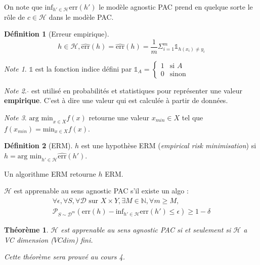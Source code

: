 \documentclass{article}
\newtheorem{theorem}{Théorème}[section]
\theoremstyle{definition}
\newtheorem{definition}{Définition}[section]
\theoremstyle{remark}
\newtheorem*{note}{Note}
\begin{document}
On note que $\mbox{inf}_{h'\in\mathcal{H}}\mbox{err}(h')$  le modèle  agnostic PAC prend en quelque sorte le rôle de $c\in\mathcal{H}$ dans le modèle PAC. 

\begin{definition}[Erreur empirique]
    $$h\in\mathcal{H}, \widehat{\mbox{err}}(h) = \widehat{\mbox{err}}(h)=\frac{1}{m}\Sigma_{i=1}^m\mathbb{1}_{h(x_i)\neq y_i}$$
\end{definition}

\begin{note}
    $\mathbb{1}$ est la fonction indice défini par 
    $\mathbb{1}_{A} =
        \begin{cases}
            1 & \text{si $A$}\\
            0 & \text{sinon}
        \end{cases}
    $
\end{note}
\begin{note}  
    $\widehat{}$  est utilisé en probabilités et statistiques pour représenter une valeur \textbf{empirique}. C'est à dire une valeur qui est calculée à partir de données. 
\end{note}
\begin{note}
    $\mbox{arg min}_{x\in X} f(x)$ retourne une valeur $x_{min}\in X$ tel que $f(x_{min}) = \mbox{min}_{x\in X} f(x)$.  
\end{note}

\begin{definition}[ERM]
    $h$ est une hypothèse ERM (\textit{empirical risk minimisation}) si $h = \mbox{arg min}_{h'\in\mathcal{H}}\widehat{\mbox{err}}(h')$.
\end{definition}

Un algorithme ERM retourne $h$ ERM.

$\mathcal{H}$ est apprenable au sens agnostic PAC s'il existe un algo : 
\begin{multline}
    \forall\epsilon, \forall S, \forall\mathcal{D} \mbox{ sur } X\times Y, \exists M\in\mathbb{N}, \forall m\geq M, \\
    \mathcal{P}_{S\sim\mathcal{D}^m}(\mbox{err}(h)-\mbox{inf}_{h'\in\mathcal{H}}\mbox{err}(h')\leq\epsilon)\geq 1-\delta
\end{multline}


\begin{theorem}
    $\mathcal{H}$ est apprenable au sens agnostic PAC si et seulement si $\mathcal{H}$ a VC dimension ($VCdim$) fini. 
\end{theorem}
\textit{Cette théorème sera prouvé au cours 4.}
\end{document}

